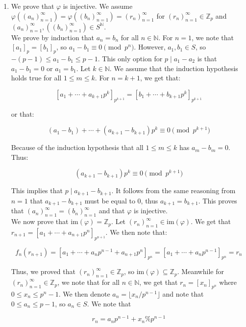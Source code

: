 \documentclass{article}
\begin{document}
\begin{enumerate}
\begin{enumerate}
    \item 
    We prove that $\varphi$ is injective. We assume $\varphi((a_n)_{n=1}^{\infty}) = \varphi((b_n)_{n=1}^{\infty}) = (r_n)^{\infty}_{n=1}$ for $(r_n)^{\infty}_{n=1} \in \mathbb{Z}_p$ and $(a_n)_{n=1}^{\infty}, ((b_n)_{n=1}^{\infty}) \in S^{\mathbb{N}}$. \\

    We prove by induction that $a_n = b_n$ for all $n \in \mathbb{N}$. For $n = 1$, we note that $[a_1]_p = [b_1]_p$, so $a_1 - b_1 \equiv 0 \pmod {p^n}$. However, $a_1, b_1 \in S$, so $-(p-1) \leq a_1 - b_1 \leq p-1$. This only option for $p \mid a_1 - a_2$ is that $a_1 - b_1 = 0$ or $a_1 = b_1$. Let $k \in \mathbb{N}$. We assume that the induction hypothesis holds true for all $1 \leq m \leq k$. For $n = k + 1$, we get that: 

    $$[a_1 + \cdots + a_{k+1}p^{k}]_{p^{k+1}} = [b_1 + \cdots + b_{k+1}p^{k}]_{p^{k+1}}$$ 

    or that: 

    $$(a_1 - b_1) + \cdots + (a_{k+1} - b_{k+1})p^{k} \equiv 0 \pmod {p^{k+1}}$$

    Because of the induction hypothesis that all $1 \leq m \leq k$ has $a_m - b_m = 0$. Thus: 

    $$(a_{k+1} - b_{k+1})p^{k} \equiv 0 \pmod {p^{k+1}}$$

    This implies that $p \mid a_{k+1} - b_{k+1}$. It follows from the same reasoning from $n=1$ that $a_{k+1} - b_{k+1}$ must be equal to 0, thus $a_{k+1} = b_{k+1}$. This proves that $(a_n)^{\infty}_{n=1} = (b_n)^{\infty}_{n=1}$ and that $\varphi$ is injective. \\

    We now prove that $\text{im}(\varphi) = \mathbb{Z}_p$. Let $(r_n)_{n=1}^{\infty} \in \text{im}(\varphi)$. We get that $r_{n+1} = [a_1 + \cdots + a_{n+1}p^n]_{p^{n+1}}$. We then note that: 
    
    $$f_n(r_{n+1}) = [a_1 + \cdots + a_{n}p^{n-1} + a_{n+1}p^n]_{p^{n}} = [a_1 + \cdots + a_{n}p^{n-1}]_{p^{n}} = r_n$$

    Thus, we proved that $(r_n)_{n=1}^{\infty} \in \mathbb{Z}_p$, so $\text{im}(\varphi) \subseteq \mathbb{Z}_p$. Meanwhile for $(r_n)_{n=1}^{\infty} \in \mathbb{Z}_p$, we note that for all $n \in \mathbb{N}$, we get that $r_n = [x_n]_{p^n}$ where $0 \leq x_n \leq p^n - 1$. We then denote $a_n = \lfloor x_n / p^{n-1} \rfloor$ and note that $0 \leq a_n \leq p - 1$, so $a_n \in S$. We note that 

    $$r_n = a_np^{n-1} + x_n \% p^{n-1}$$ 
    

\end{enumerate}
\end{enumerate}
\end{document}
